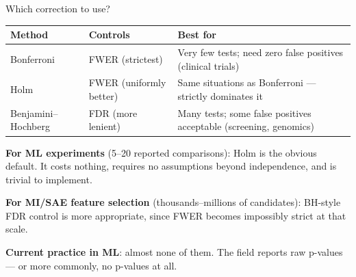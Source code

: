 \documentclass[aspectratio=169,11pt]{beamer}
\begin{document}
\begin{frame}{Which correction to use?}

\vspace{0.3em}

{\small
\begin{tabular}{lp{4cm}p{4.5cm}}
\toprule
\textbf{Method} & \textbf{Controls} & \textbf{Best for} \\
\midrule
Bonferroni & FWER (strictest) & Very few tests; need zero false positives (clinical trials) \\[4pt]
Holm & FWER (uniformly better) & Same situations as Bonferroni --- strictly dominates it \\[4pt]
Benjamini--Hochberg & FDR (more lenient) & Many tests; some false positives acceptable (screening, genomics) \\
\bottomrule
\end{tabular}
}

\vspace{0.8em}

{\small \textbf{For ML experiments} (5--20 reported comparisons): Holm is the obvious default. It costs nothing, requires no assumptions beyond independence, and is trivial to implement.}

\vspace{0.5em}

{\small \textbf{For MI/SAE feature selection} (thousands--millions of candidates): BH-style FDR control is more appropriate, since FWER becomes impossibly strict at that scale.}

\vspace{0.5em}

{\small \textbf{Current practice in ML}: almost none of them. The field reports raw p-values --- or more commonly, no p-values at all.}
\end{frame}
\end{document}
